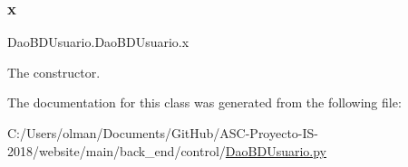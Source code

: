 \subsubsection{\texorpdfstring{x}{x}}
{\footnotesize\ttfamily Dao\+B\+D\+Usuario.\+Dao\+B\+D\+Usuario.\+x}



The constructor. 



The documentation for this class was generated from the following file\+:\begin{DoxyCompactItemize}
\item 
C\+:/\+Users/olman/\+Documents/\+Git\+Hub/\+A\+S\+C-\/\+Proyecto-\/\+I\+S-\/2018/website/main/back\+\_\+end/control/\mbox{\hyperlink{_dao_b_d_usuario_8py}{Dao\+B\+D\+Usuario.\+py}}\end{DoxyCompactItemize}

